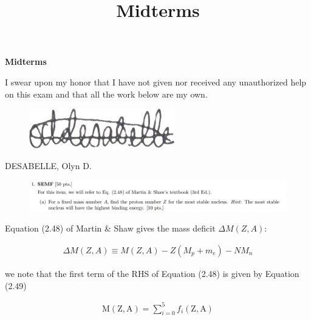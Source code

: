 \documentclass[11pt]{article}
\theoremstyle{definition}
\begin{document}
\setcounter{section}{2}
\title{Midterms}

\pagestyle{fancy}
\fancyhf{}

\begin{center}
{\LARGE \bf Midterms}\\
\end{center}

\begin{mdframed}
    I swear upon my honor that I have not given nor received any unauthorized help on this exam and that all the work below are my own.
\end{mdframed}
\begin{figure}[H]
    \includegraphics[scale = 20]{my e-sig.jpg}
\end{figure}

DESABELLE, Olyn D.

\noindent\makebox[\linewidth]{\rule{\paperwidth}{0.4pt}}



\begin{figure}[H]
    \centering
    \includegraphics[scale = 0.5]{1a.png}
\end{figure}

Equation (2.48) of Martin \& Shaw gives the mass deficit $\Delta M(Z,A)$:

\begin{align*}
    \Delta M(Z,A) \equiv M(Z,A) - Z(M_p + m_e) - NM_n
    \tag*{(2.48)}
\end{align*}

we note that the first term of the RHS of Equation (2.48) is given by Equation (2.49)

\begin{align*}
    \text{M}(\text{Z},\text{A}) = \sum_{i=0}^{5} f_i(\text{Z},\text{A}) \tag{2.49}
\end{align*}
\end{document}
